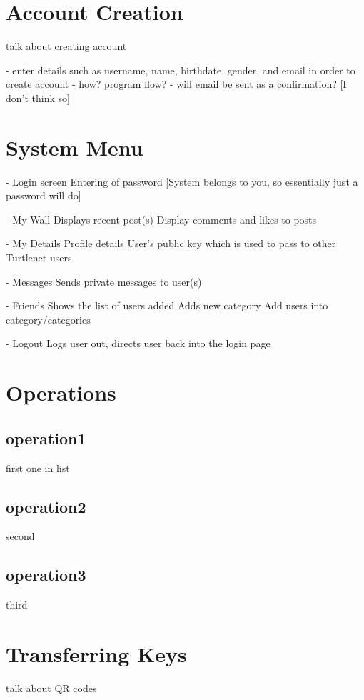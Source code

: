 \section{Account Creation}
talk about creating account

- enter details such as username, name, birthdate, gender, and email in order to create account
- how? program flow?
- will email be sent as a confirmation? [I don't think so]

\section{System Menu}
- Login screen
Entering of password [System belongs to you, so essentially just a password will do]

- My Wall
Displays recent post(s)
Display comments and likes to posts

- My Details
Profile details
User's public key which is used to pass to other Turtlenet users

- Messages
Sends private messages to user(s)

- Friends
Shows the list of users added
Adds new category
Add users into category/categories

- Logout
Logs user out, directs user back into the login page

\section{Operations}
\subsection{operation1}
first one in list
\subsection{operation2}
second
\subsection{operation3}
third
\section{Transferring Keys}
talk about QR codes